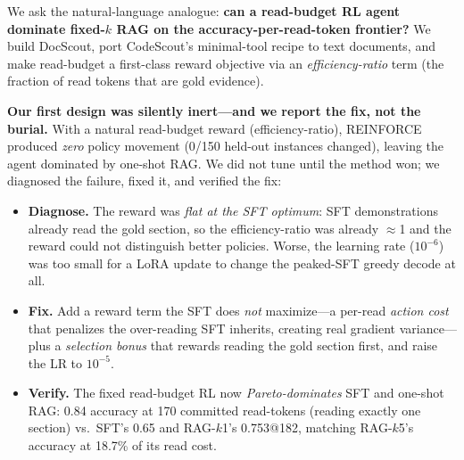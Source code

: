 \documentclass[10pt,twocolumn]{article}
\begin{document}
We ask the natural-language analogue: \textbf{can a read-budget RL agent dominate fixed-$k$ RAG on the accuracy-per-read-token frontier?} We build DocScout, port CodeScout's minimal-tool recipe to text documents, and make read-budget a first-class reward objective via an \emph{efficiency-ratio} term (the fraction of read tokens that are gold evidence).

\textbf{Our first design was silently inert---and we report the fix, not the burial.} With a natural read-budget reward (efficiency-ratio), REINFORCE produced \emph{zero} policy movement (0/150 held-out instances changed), leaving the agent dominated by one-shot RAG. We did not tune until the method won; we diagnosed the failure, fixed it, and verified the fix:

\begin{itemize}\itemsep0pt
\item \textbf{Diagnose.} The reward was \emph{flat at the SFT optimum}: SFT demonstrations already read the gold section, so the efficiency-ratio was already $\approx$1 and the reward could not distinguish better policies. Worse, the learning rate ($10^{-6}$) was too small for a LoRA update to change the peaked-SFT greedy decode at all.
\item \textbf{Fix.} Add a reward term the SFT does \emph{not} maximize---a per-read \emph{action cost} that penalizes the over-reading SFT inherits, creating real gradient variance---plus a \emph{selection bonus} that rewards reading the gold section first, and raise the LR to $10^{-5}$.
\item \textbf{Verify.} The fixed read-budget RL now \emph{Pareto-dominates} SFT and one-shot RAG: 0.84 accuracy at 170 committed read-tokens (reading exactly one section) vs.\ SFT's 0.65 and RAG-$k$1's 0.753@182, matching RAG-$k$5's accuracy at 18.7\% of its read cost.
\end{itemize}
\end{document}
